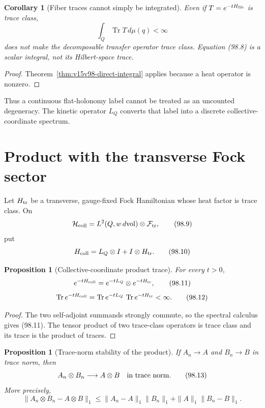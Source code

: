 \documentclass[11pt]{article}
\newtheorem{proposition}[theorem]{Proposition}
\newtheorem{corollary}[theorem]{Corollary}
\theoremstyle{remark}
\begin{document}
\begin{corollary}[Fiber traces cannot simply be integrated]
\label{cor:v15v98-fiber}
Even if \(T=e^{-tH_{\rm fib}}\) is trace class,
\[
 \int_Q\operatorname{Tr}T\,d\mu(q)<\infty             \tag{98.8}
\]
does not make the decomposable transfer operator trace class.
Equation (98.8) is a scalar integral, not its Hilbert-space trace.
\end{corollary}

\begin{proof}
Theorem~\ref{thm:v15v98-direct-integral} applies because a heat
operator is nonzero.
\end{proof}

Thus a continuous flat-holonomy label cannot be treated as an
uncounted degeneracy.  The kinetic operator \(L_Q\) converts that
label into a discrete collective-coordinate spectrum.

\section{Product with the transverse Fock sector}

Let \(H_{\rm tr}\) be a transverse, gauge-fixed Fock Hamiltonian
whose heat factor is trace class.  On
\[
 {\cal H}_{\rm coll}=L^2(Q,w\,d{\rm vol})\otimes{\cal F}_{\rm tr},
                                                               \tag{98.9}
\]
put
\[
 H_{\rm coll}=L_Q\otimes I+I\otimes H_{\rm tr}.        \tag{98.10}
\]

\begin{proposition}[Collective-coordinate product trace]
\label{prop:v15v98-product}
For every \(t>0\),
\[
 e^{-tH_{\rm coll}}
 =e^{-tL_Q}\otimes e^{-tH_{\rm tr}},                  \tag{98.11}
\]
\[
 \operatorname{Tr}e^{-tH_{\rm coll}}
 =\operatorname{Tr}e^{-tL_Q}\,
  \operatorname{Tr}e^{-tH_{\rm tr}}<\infty.           \tag{98.12}
\]
\end{proposition}

\begin{proof}
The two self-adjoint summands strongly commute, so the spectral
calculus gives (98.11).  The tensor product of two trace-class
operators is trace class and its trace is the product of traces.
\end{proof}

\begin{proposition}[Trace-norm stability of the product]
\label{prop:v15v98-product-continuity}
If \(A_n\to A\) and \(B_n\to B\) in trace norm, then
\[
 A_n\otimes B_n\longrightarrow A\otimes B
 \quad\hbox{in trace norm}.                            \tag{98.13}
\]
More precisely,
\[
 \|A_n\otimes B_n-A\otimes B\|_1
 \leq\|A_n-A\|_1\|B_n\|_1
      +\|A\|_1\|B_n-B\|_1.                            \tag{98.14}
\]
\end{proposition}
\end{document}
